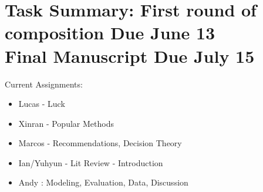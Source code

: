 \section*{Task Summary: First round of composition Due June 13\\
Final Manuscript Due July 15}

Current Assignments:
\begin{itemize}
\item Lucas - Luck
\item Xinran - Popular Methods
\item Marcos - Recommendations, Decision Theory
\item Ian/Yuhyun - Lit Review - Introduction
\item Andy : Modeling, Evaluation, Data, Discussion
\end{itemize}
